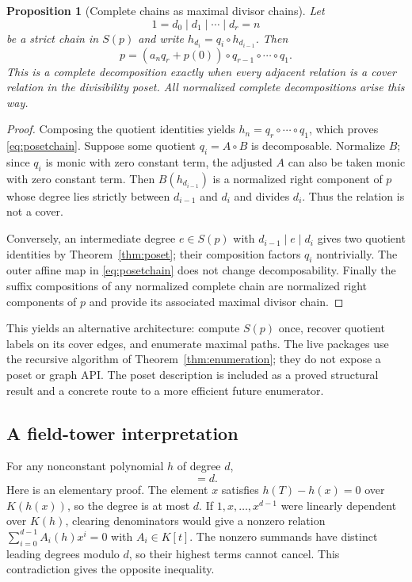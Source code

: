 \documentclass[11pt,a4paper]{article}
\numberwithin{equation}{section}
\newtheorem{proposition}[theorem]{Proposition}
\theoremstyle{definition}
\theoremstyle{remark}
\begin{document}
\begin{proposition}[Complete chains as maximal divisor chains]\label{prop:maxchains}
Let
\[
 1=d_0\mid d_1\mid\cdots\mid d_r=n
\]
be a strict chain in $S(p)$ and write $h_{d_i}=q_i\circ h_{d_{i-1}}$. Then
\begin{equation}
 p=(a_nq_r+p(0))\circ q_{r-1}\circ\cdots\circ q_1.\label{eq:posetchain}
\end{equation}
This is a complete decomposition exactly when every adjacent relation is a cover relation in the divisibility poset. All normalized complete decompositions arise this way.
\end{proposition}
\begin{proof}
Composing the quotient identities yields $h_n=q_r\circ\cdots\circ q_1$, which proves \eqref{eq:posetchain}. Suppose some quotient $q_i=A\circ B$ is decomposable. Normalize $B$; since $q_i$ is monic with zero constant term, the adjusted $A$ can also be taken monic with zero constant term. Then $B(h_{d_{i-1}})$ is a normalized right component of $p$ whose degree lies strictly between $d_{i-1}$ and $d_i$ and divides $d_i$. Thus the relation is not a cover.

Conversely, an intermediate degree $e\in S(p)$ with $d_{i-1}\mid e\mid d_i$ gives two quotient identities by Theorem~\ref{thm:poset}; their composition factors $q_i$ nontrivially. The outer affine map in \eqref{eq:posetchain} does not change decomposability. Finally the suffix compositions of any normalized complete chain are normalized right components of $p$ and provide its associated maximal divisor chain.
\end{proof}

This yields an alternative architecture: compute $S(p)$ once, recover quotient labels on its cover edges, and enumerate maximal paths. The live packages use the recursive algorithm of Theorem~\ref{thm:enumeration}; they do not expose a poset or graph API. The poset description is included as a proved structural result and a concrete route to a more efficient future enumerator.

\subsection{A field-tower interpretation}
For any nonconstant polynomial $h$ of degree $d$,
\begin{equation}
 [K(x):K(h(x))]=d.\label{eq:fielddegree}
\end{equation}
Here is an elementary proof. The element $x$ satisfies $h(T)-h(x)=0$ over $K(h(x))$, so the degree is at most $d$. If $1,x,\ldots,x^{d-1}$ were linearly dependent over $K(h)$, clearing denominators would give a nonzero relation $\sum_{i=0}^{d-1}A_i(h)x^i=0$ with $A_i\in K[t]$. The nonzero summands have distinct leading degrees modulo $d$, so their highest terms cannot cancel. This contradiction gives the opposite inequality.
\end{document}
